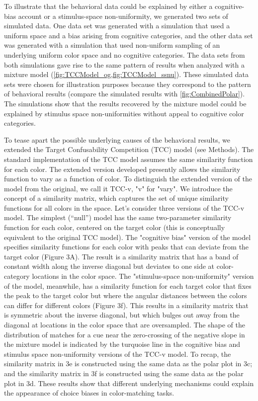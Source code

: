 To illustrate that the behavioral data could be explained by either a cognitive-bias account or a stimulus-space non-uniformity, we generated two sets of simulated data. 
One data set was generated with a simulation that used a uniform space and a bias arising from cognitive categories, and the other data set was generated with a simulation that used non-uniform sampling of an underlying uniform color space and no cognitive categories.
The data sets from both simulations gave rise to the same pattern of results when analyzed with a mixture model (\autoref{fig:TCCModel_og,fig:TCCModel_ssnu}).
These simulated data sets were chosen for illustration purposes because they correspond to the pattern of behavioral results (compare the simulated results with \autoref{fig:CombinedPolar}). 
The simulations show that the results recovered by the mixture model could be explained by stimulus space non-uniformities without appeal to cognitive color categories. 

To tease apart the possible underlying causes of the behavioral results, we extended the Target Confusability Competition (TCC) model \citep{schurgin_psychophysical_2020} (see Methods). 
The standard implementation of the TCC model assumes the same similarity function for each color. 
The extended version developed presently allows the similarity function to vary as a function of color. To distinguish the extended version of the model from the original, we call it TCC-v, "v" for "vary".
We introduce the concept of a similarity matrix, which captures the set of unique similarity functions for all colors in the space.
Let's consider three versions of the TCC-v model.
The simplest (“null”) model has the same two-parameter similarity function for each color, centered on the target color (this is conceptually equivalent to the original TCC model).  
The "cognitive bias" version of the model specifies similarity functions for each color with peaks that can deviate from the target color (Figure 3A). 
The result is a similarity matrix that has a band of constant width along the inverse diagonal but deviates to one side at color-category locations in the color space. 
The "stimulus-space non-uniformity" version of the model, meanwhile, has a similarity function for each target color that fixes the peak to the target color but where the angular distances between the colors can differ for different colors (Figure 3f). 
This results in a similarity matrix that is symmetric about the inverse diagonal, but which bulges out away from the diagonal at locations in the color space that are oversampled. 
The shape of the distribution of matches for a cue near the zero-crossing of the negative slope in the mixture model is indicated by the turquoise line in the cognitive bias and stimulus space non-uniformity versions of the TCC-v model. 
To recap, the similarity matrix in 3e is constructed using the same data as the polar plot in 3c; and the similarity matrix in 3f is constructed using the same data as the polar plot in 3d. 
These results show that different underlying mechanisms could explain the appearance of choice biases in color-matching tasks.

